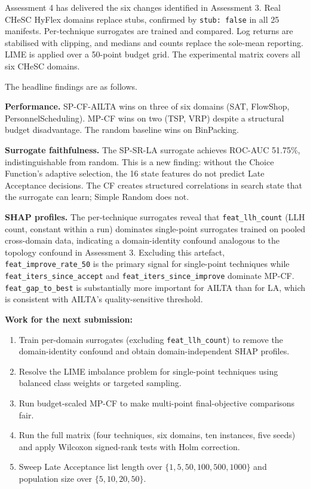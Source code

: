\documentclass[11pt,a4paper]{article}
\begin{document}
Assessment 4 has delivered the six changes identified in Assessment 3. Real CHeSC
HyFlex domains replace stubs, confirmed by \texttt{stub: false} in all 25 manifests.
Per-technique surrogates are trained and compared. Log returns are stabilised with
clipping, and medians and counts replace the sole-mean reporting. LIME is applied
over a 50-point budget grid. The experimental matrix covers all six CHeSC domains.

The headline findings are as follows.

\textbf{Performance.} SP-CF-AILTA wins on three of six domains (SAT, FlowShop,
PersonnelScheduling). MP-CF wins on two (TSP, VRP) despite a structural budget
disadvantage. The random baseline wins on BinPacking.

\textbf{Surrogate faithfulness.} The SP-SR-LA surrogate achieves ROC-AUC 51.75\%,
indistinguishable from random. This is a new finding: without the Choice Function's
adaptive selection, the 16 state features do not predict Late Acceptance decisions.
The CF creates structured correlations in search state that the surrogate can learn;
Simple Random does not.

\textbf{SHAP profiles.} The per-technique surrogates reveal that
\texttt{feat\_llh\_count} (LLH count, constant within a run) dominates single-point
surrogates trained on pooled cross-domain data, indicating a domain-identity confound
analogous to the topology confound in Assessment 3. Excluding this artefact,
\texttt{feat\_improve\_rate\_50} is the primary signal for single-point techniques
while \texttt{feat\_iters\_since\_accept} and \texttt{feat\_iters\_since\_improve}
dominate MP-CF. \texttt{feat\_gap\_to\_best} is substantially more important for
AILTA than for LA, which is consistent with AILTA's quality-sensitive threshold.

\textbf{Work for the next submission:}

\begin{enumerate}
  \item Train per-domain surrogates (excluding \texttt{feat\_llh\_count}) to
        remove the domain-identity confound and obtain domain-independent SHAP profiles.
  \item Resolve the LIME imbalance problem for single-point techniques using
        balanced class weights or targeted sampling.
  \item Run budget-scaled MP-CF to make multi-point final-objective comparisons fair.
  \item Run the full matrix (four techniques, six domains, ten instances, five
        seeds) and apply Wilcoxon signed-rank tests with Holm correction.
  \item Sweep Late Acceptance list length over $\{1, 5, 50, 100, 500, 1000\}$
        and population size over $\{5, 10, 20, 50\}$.
\end{enumerate}
\end{document}
